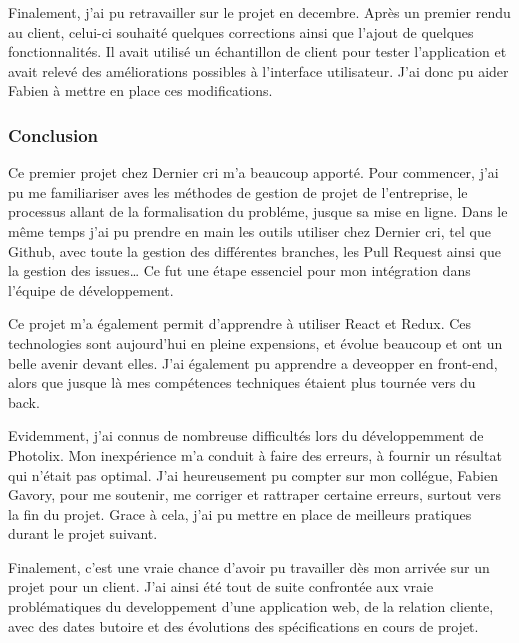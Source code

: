\documentclass[12pt,a4paper]{article}
\begin{document}
  \bigskip

  Finalement, j'ai pu retravailler sur le projet en decembre. Après un
  premier rendu au client, celui-ci souhaité quelques corrections ainsi
  que l'ajout de quelques fonctionnalités. Il avait utilisé un échantillon
  de client pour tester l'application et avait relevé des améliorations
  possibles à l'interface utilisateur. J'ai donc pu aider Fabien à mettre
  en place ces modifications.

  \bigskip

  \subsubsection{Conclusion}\label{conclusion}

  \bigskip

  Ce premier projet chez Dernier cri m'a beaucoup apporté. Pour commencer,
  j'ai pu me familiariser aves les méthodes de gestion de projet de
  l'entreprise, le processus allant de la formalisation du probléme,
  jusque sa mise en ligne. Dans le même temps j'ai pu prendre en main les
  outils utiliser chez Dernier cri, tel que Github, avec toute la gestion
  des différentes branches, les Pull Request ainsi que la gestion des
  issues\ldots{} Ce fut une étape essenciel pour mon intégration dans
  l'équipe de développement.

  \bigskip

  Ce projet m'a également permit d'apprendre à utiliser React et Redux.
  Ces technologies sont aujourd'hui en pleine expensions, et évolue
  beaucoup et ont un belle avenir devant elles. J'ai également pu
  apprendre a deveopper en front-end, alors que jusque là mes compétences
  techniques étaient plus tournée vers du back.

  \bigskip

  Evidemment, j'ai connus de nombreuse difficultés lors du développemment
  de Photolix. Mon inexpérience m'a conduit à faire des erreurs, à fournir
  un résultat qui n'était pas optimal. J'ai heureusement pu compter sur
  mon collégue, Fabien Gavory, pour me soutenir, me corriger et rattraper
  certaine erreurs, surtout vers la fin du projet. Grace à cela, j'ai pu
  mettre en place de meilleurs pratiques durant le projet suivant.

  \bigskip

  Finalement, c'est une vraie chance d'avoir pu travailler dès mon arrivée
  sur un projet pour un client. J'ai ainsi été tout de suite confrontée
  aux vraie problématiques du developpement d'une application web, de la
  relation cliente, avec des dates butoire et des évolutions des
  spécifications en cours de projet.
\end{document}
